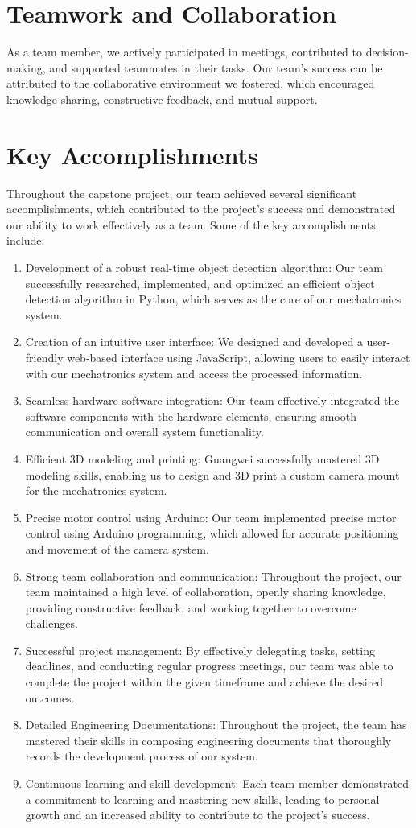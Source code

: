 \documentclass{article}
\begin{document}
\section{Teamwork and Collaboration}
As a team member, we actively participated in meetings, contributed to decision-making, and supported teammates in their tasks. Our team's success can be attributed to the collaborative environment we fostered, which encouraged knowledge sharing, constructive feedback, and mutual support.
\section{Key Accomplishments}
Throughout the capstone project, our team achieved several significant accomplishments, which contributed to the project's success and demonstrated our ability to work effectively as a team. Some of the key accomplishments include:
\begin{enumerate}
    \item Development of a robust real-time object detection algorithm: Our team successfully researched, implemented, and optimized an efficient object detection algorithm in Python, which serves as the core of our mechatronics system.
    \item Creation of an intuitive user interface: We designed and developed a user-friendly web-based interface using JavaScript, allowing users to easily interact with our mechatronics system and access the processed information.
    \item Seamless hardware-software integration: Our team effectively integrated the software components with the hardware elements, ensuring smooth communication and overall system functionality.
    \item Efficient 3D modeling and printing: Guangwei successfully mastered 3D modeling skills, enabling us to design and 3D print a custom camera mount for the mechatronics system.
    \item Precise motor control using Arduino: Our team implemented precise motor control using Arduino programming, which allowed for accurate positioning and movement of the camera system.
    \item Strong team collaboration and communication: Throughout the project, our team maintained a high level of collaboration, openly sharing knowledge, providing constructive feedback, and working together to overcome challenges.
    \item Successful project management: By effectively delegating tasks, setting deadlines, and conducting regular progress meetings, our team was able to complete the project within the given timeframe and achieve the desired outcomes.
    \item Detailed Engineering Documentations: Throughout the project, the team has mastered their skills in composing engineering documents that thoroughly records the development process of our system. 
    \item Continuous learning and skill development: Each team member demonstrated a commitment to learning and mastering new skills, leading to personal growth and an increased ability to contribute to the project's success.
\end{enumerate}
\end{document}
